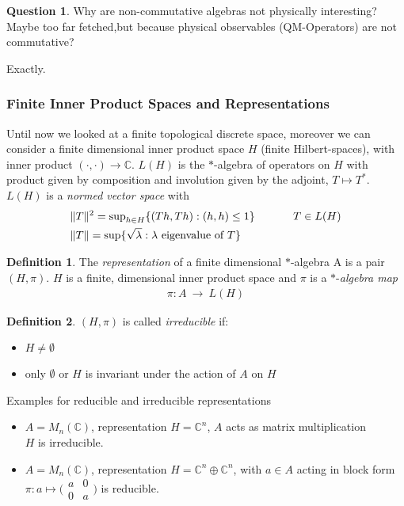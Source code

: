 \documentclass[a4paper]{article}
\theoremstyle{definition}
\newtheorem{definition}{Definition}
\theoremstyle{definition}
\newtheorem{question}{Question}
\theoremstyle{definition}
\theoremstyle{theorem}
\theoremstyle{theorem}
\begin{document}
\begin{question}
    Why are non-commutative algebras not physically interesting?
    Maybe too far fetched,but because physical observables (QM-Operators) are not commutative?
\end{question}
Exactly.

\subsubsection{Finite Inner Product Spaces and Representations}
Until now we looked at a finite topological discrete space, moreover we can consider a
finite dimensional inner product space $H$ (finite Hilbert-spaces), with inner product
$(\cdot,\cdot)\rightarrow \mathbb{C}$. $L(H)$ is the $*$-algebra of operators on $H$
with product given by composition and involution given by the adjoint, $T \mapsto T^*$.
$L(H)$ is a \textit{normed vector space} with
\begin{align}
    &\|T\|^2 = \text{sup}_{h \in H}\{(Th,Th): (h,h) \leq 1\} \hspace{0.1\textwidth} T \in L(H) \\
    &\|T\| = \text{sup}\{\sqrt{\lambda}: \lambda \text{ eigenvalue of } T\}
\end{align}


\begin{definition}
    The \textit{representation} of a finite dimensional $*$-algebra A is a pair $(H, \pi)$.
    $H$ is a finite, dimensional inner product space and $\pi$ is a $*$-\textit{algebra map}
    \begin{align}
        \pi:A\ \rightarrow \ L(H)
    \end{align}
\end{definition}
\begin{definition}
    $(H, \pi)$ is called \textit{irreducible} if:
    \begin{itemize}
        \item $H \neq \emptyset$
        \item only $\emptyset$ or $H$ is invariant under the action of $A$ on $H$
    \end{itemize}
\end{definition}

Examples for reducible and irreducible representations
\begin{itemize}
    \item $A = M_n(\mathbb{C})$, representation $H=\mathbb{C}^n$, $A$ acts as matrix multiplication\\
            $H$ is irreducible.
    \item $A = M_n(\mathbb{C})$, representation $H=\mathbb{C}^n\oplus \mathbb{C}^n$, with $a \in A$ acting
        in block form \\ $\pi: a \mapsto \big(\begin{smallmatrix} a & 0\\ 0 & a \end{smallmatrix}\big)$ is
            reducible.
\end{itemize}
\end{document}
